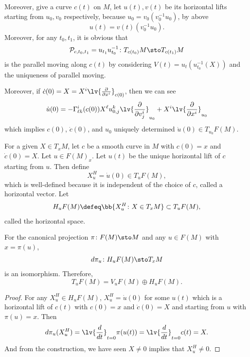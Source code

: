 \begin{rmk}
    Moreover, give a curve $c(t)$ on $M$, let $u(t),v(t)$ be its horizontal lifts starting from $u_0,v_0$ respectively, because $u_0 = v_0(v_0^{-1}u_0)$, by above
    \begin{equation*}
        u(t) = v(t)(v_0^{-1}u_0).
    \end{equation*} 
    Moreover, for any $t_0,t_1$, it is obvious that
    \begin{equation*}
        \mathcal{P}_{c,t_0,t_1} = u_{t_1}u_{t_0}^{-1} \colon T_{c(t_0)}M \sto T_{c(t_1)}M
    \end{equation*}
    is the parallel moving along $c(t)$ by considering $V(t) = u_t(u_{t_0}^{-1}(X))$ and the uniqueness of parallel moving. 
\end{rmk}
\begin{rmk}
    Moreover, if $\dot{c}(0) = X = X^i\lv{\frac{\partial}{\partial x^i}}_{c(0)}$, then we can see
    \begin{equation*}
        \dot{u}(0) = -\Gamma^i_{\ell k}(c(0))X^\ell u^k_{0,j} \lv{\frac{\partial}{\partial v_j^i}}_{u_0} + X^i \lv{\frac{\partial}{\partial x^i}}_{u_0}
    \end{equation*}
    which implies $c(0)$, $\dot{c}(0)$, and $u_0$ uniquely determined $\dot{u}(0) \in T_{u_0}F(M)$.
\end{rmk}

For a given $X \in T_xM$, let $c$ be a smooth curve in $M$ with $c(0) = x$ and $\dot{c}(0) = X$. Let $u \in F(M)_{x}$. Let $u(t)$ be the unique horizontal lift of $c$ starting from $u$. Then define
\begin{equation*}
    X^H_u = \dot{u}(0) \in T_u F(M),
\end{equation*}
which is well-defined because it is independent of the choice of $c$, called a horizontal vector. Let
\begin{equation*}
    H_uF(M) \defeq \bb{X^H_u \colon X \in T_xM} \subset T_uF(M),
\end{equation*}
called the horizontal space.

\begin{lem}
    For the canonical projection $\pi \colon F(M) \sto M$ and any $u \in F(M)$ with $x = \pi(u)$,
    \begin{equation*}
        d\pi_u \colon H_uF(M) \sto T_xM
    \end{equation*}
    is an isomorphism. Therefore,
    \begin{equation*}
        T_uF(M) = V_uF(M) \oplus H_uF(M).
    \end{equation*}
\end{lem}
\begin{proof}
    For any $X^H_u \in H_uF(M)$, $X^H_u = \dot{u}(0)$ for some $u(t)$ which is a horizontal lift of $c(t)$ with $c(0) =x$ and $\dot{c}(0) =X$ and starting from $u$ with $\pi(u) = x$. Then
    \begin{equation*}
        d\pi_u(X^H_u) = \lv{\frac{d}{dt}}_{t = 0}\pi(u(t)) = \lv{\frac{d}{dt}}_{t = 0}c(t) = X.
    \end{equation*}
    And from the construction, we have seen $X \neq 0$ implies that $X^H_u \neq 0$.
\end{proof}


